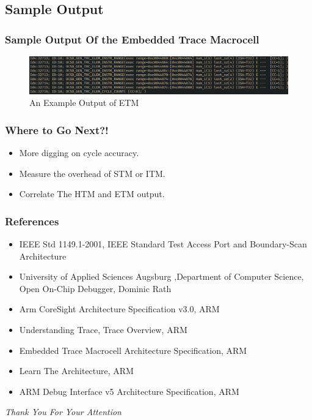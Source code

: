 \documentclass{beamer}
\begin{document}
\subsection{Sample Output}
\begin{frame}
    \frametitle{Sample Output Of the Embedded Trace Macrocell}
    \begin{figure}
        \centering
        \includegraphics[width=1.0\columnwidth]{out.png}
        \caption{An Example Output of ETM}
        \label{fig:out}
    \end{figure}
\end{frame}

\begin{frame}
    \frametitle{Where to Go Next?!}
    \begin{itemize}
        \item More digging on cycle accuracy.
        \item Measure the overhead of STM or ITM.
        \item Correlate The HTM and ETM output.
    \end{itemize}
\end{frame}

\begin{frame}
    \frametitle{References}
    \begin{itemize}
        \item IEEE Std 1149.1-2001, IEEE Standard Test Access Port and Boundary-Scan Architecture
        \item University of Applied Sciences Augsburg ,Department of Computer Science, Open On-Chip Debugger, Dominic Rath
        \item Arm CoreSight Architecture Specification v3.0, ARM
        \item Understanding Trace, Trace Overview, ARM
        \item Embedded Trace Macrocell Architecture Specification, ARM
        \item Learn The Architecture, ARM
        \item ARM Debug Interface v5 Architecture Specification, ARM
    \end{itemize}
\end{frame}

\begin{frame}
  \centering \Large
  \emph{Thank You For Your Attention}
\end{frame}
\end{document}

